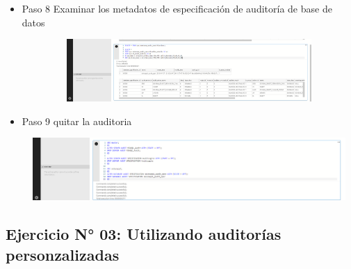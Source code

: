 \begin{itemize}
   	      \item Paso 8 Examinar los metadatos de especificación de auditoría de base de datos
				 
				 	
					\begin{center}
    				\includegraphics[width=16cm, height=90]{./Imagenes/Imagen_18}
   				    \end{center}
   				    
   		   \item Paso 9 quitar la auditoria
				 
				 	
					\begin{center}
    				\includegraphics[width=16cm, height=90]{./Imagenes/Imagen_19}
   				    \end{center}
   				    
   		   \end{itemize}
				    \clearpage	
				    
				    
\subsection{Ejercicio N° 03: Utilizando auditorías personzalizadas}

